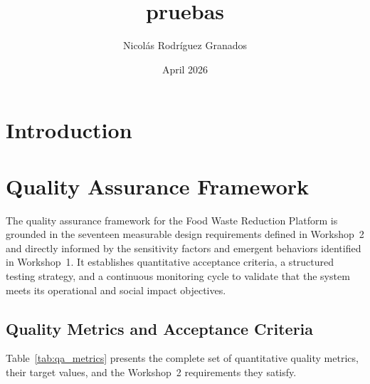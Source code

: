 \documentclass[conference]{IEEEtran}
\title{pruebas}
\author{Nicolás Rodríguez Granados}
\date{April 2026}
\begin{document}
\maketitle

\section{Introduction}
\section{Quality Assurance Framework}

The quality assurance framework for the Food Waste Reduction Platform is grounded in the seventeen measurable design requirements defined in Workshop~2 and directly informed by the sensitivity factors and emergent behaviors identified in Workshop~1. It establishes quantitative acceptance criteria, a structured testing strategy, and a continuous monitoring cycle to validate that the system meets its operational and social impact objectives.

\subsection{Quality Metrics and Acceptance Criteria}

Table~\ref{tab:qa_metrics} presents the complete set of quantitative quality metrics, their target values, and the Workshop~2 requirements they satisfy.
\end{document}
